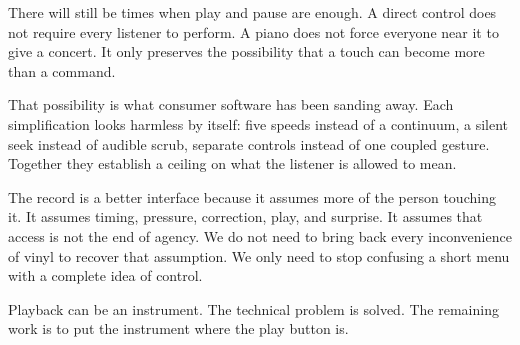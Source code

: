 \documentclass[11pt,letterpaper]{article}
\begin{document}
There will still be times when play and pause are enough. A direct control does not require every listener to perform. A piano does not force everyone near it to give a concert. It only preserves the possibility that a touch can become more than a command.

That possibility is what consumer software has been sanding away. Each simplification looks harmless by itself: five speeds instead of a continuum, a silent seek instead of audible scrub, separate controls instead of one coupled gesture. Together they establish a ceiling on what the listener is allowed to mean.

The record is a better interface because it assumes more of the person touching it. It assumes timing, pressure, correction, play, and surprise. It assumes that access is not the end of agency. We do not need to bring back every inconvenience of vinyl to recover that assumption. We only need to stop confusing a short menu with a complete idea of control.

Playback can be an instrument. The technical problem is solved. The remaining work is to put the instrument where the play button is.

\end{document}
